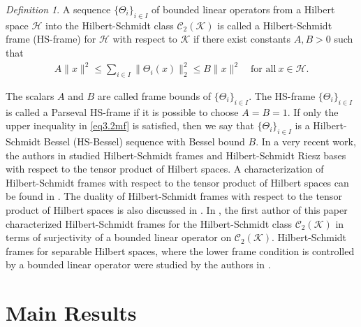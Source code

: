 \documentclass[reqno]{amsart}
\theoremstyle{plain}
\theoremstyle{remark}
\newtheorem{defn}[thm]{Def{}inition}
\numberwithin{equation}{section}
\begin{document}
\begin{defn}\cite{SA}
A sequence $\{\Theta_i\}_{i \in I}$ of bounded linear operators from a Hilbert space $\mathcal{H}$ into the Hilbert-Schmidt class $\mathcal{C}_2(\mathcal{K})$ is called a Hilbert-Schmidt frame (HS-frame) for $\mathcal{H}$ with respect to $\mathcal{K}$ if there exist constants $A, B > 0$ such that
\begin{align}\label{eq3.2mf}
A \|x\|^2 \leq \sum_{i \in I} \|\Theta_i(x)\|_2^2 \leq B \|x\|^2 \quad \text{for all} \ x \in \mathcal{H}.
\end{align}
\end{defn}
The scalars $A$ and $B$ are called frame bounds of $\{\Theta_i\}_{i \in I}$. The HS-frame $\{\Theta_i\}_{i \in I}$ is called a Parseval HS-frame if it is possible to choose $A=B=1$.
If only the upper inequality in \eqref{eq3.2mf} is satisfied,   then we say that $\{\Theta_i\}_{i \in I}$  is  a Hilbert-Schmidt Bessel  (HS-Bessel) sequence with Bessel bound $B$.
In a very recent work, the authors in \cite{JVPDF1} studied Hilbert-Schmidt frames and Hilbert-Schmidt Riesz bases with respect to the tensor product of Hilbert spaces. A characterization of  Hilbert-Schmidt frames  with respect to the tensor product of Hilbert spaces can be found in \cite{JVPDF1}. The duality of  Hilbert-Schmidt frames  with respect to the tensor product of Hilbert spaces is also discussed in \cite{JVPDF1}.  In \cite{J}, the first author of this paper characterized Hilbert-Schmidt frames for the Hilbert-Schmidt class $\mathcal{C}_2(\mathcal{K})$ in terms of  surjectivity of a  bounded linear operator on $\mathcal{C}_2(\mathcal{K})$. Hilbert-Schmidt frames for separable Hilbert spaces, where the lower frame condition is controlled by a bounded linear operator were studied by the authors in \cite{JV23}.




\section{Main  Results}\label{sec3}
\end{document}
